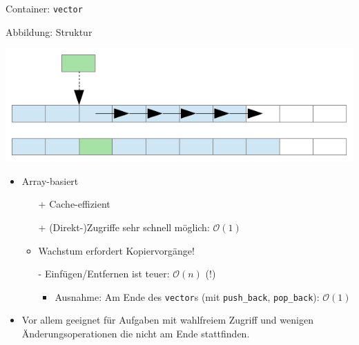 \begin{frame}[fragile]{Container: \texttt{vector}}
	\begin{block}{Abbildung: Struktur}
		\begin{center}
			\includegraphics[width=0.6\linewidth]{images/vector.pdf}
		\end{center}
	\end{block}

	\begin{itemize}
		\item Array-basiert
		\pause
		\begin{itemize}
			\item[+] Cache-effizient
			\item[+] (Direkt-)Zugriffe sehr schnell möglich: $\mathcal{O}(1)$
			\pause
			\item Wachstum erfordert Kopiervorgänge!
			\item[-] Einfügen/Entfernen ist teuer: $\mathcal{O}(n)$ (!)
			\begin{itemize}
				\item Ausnahme: Am Ende des \verb|vector|s (mit \verb|push_back|, \verb|pop_back|): $\mathcal{O}(1)$
			\end{itemize}
		\end{itemize}
		\pause
		\item Vor allem geeignet für Aufgaben mit wahlfreiem Zugriff und wenigen Änderungsoperationen die nicht am Ende stattfinden.
	\end{itemize}
\end{frame}
	
